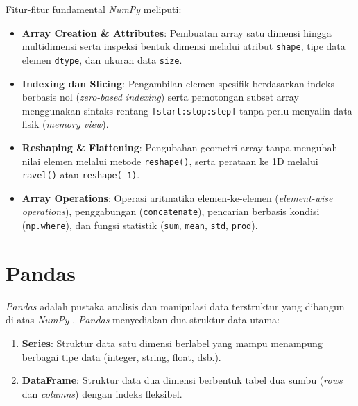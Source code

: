 \documentclass[a4paper,oneside,12pt]{report}
\begin{document}
Fitur-fitur fundamental \textit{NumPy} meliputi:
\begin{itemize}
    \item \textbf{Array Creation \& Attributes}: Pembuatan array satu dimensi hingga multidimensi serta inspeksi bentuk dimensi melalui atribut \texttt{shape}, tipe data elemen \texttt{dtype}, dan ukuran data \texttt{size}.
    \item \textbf{Indexing dan Slicing}: Pengambilan elemen spesifik berdasarkan indeks berbasis nol (\textit{zero-based indexing}) serta pemotongan subset array menggunakan sintaks rentang \texttt{[start:stop:step]} tanpa perlu menyalin data fisik (\textit{memory view}).
    \item \textbf{Reshaping \& Flattening}: Pengubahan geometri array tanpa mengubah nilai elemen melalui metode \texttt{reshape()}, serta perataan ke 1D melalui \texttt{ravel()} atau \texttt{reshape(-1)}.
    \item \textbf{Array Operations}: Operasi aritmatika elemen-ke-elemen (\textit{element-wise operations}), penggabungan (\texttt{concatenate}), pencarian berbasis kondisi (\texttt{np.where}), dan fungsi statistik (\texttt{sum}, \texttt{mean}, \texttt{std}, \texttt{prod}).
\end{itemize}

\section{Pandas}
\textit{Pandas} adalah pustaka analisis dan manipulasi data terstruktur yang dibangun di atas \textit{NumPy} \cite{ref2}. \textit{Pandas} menyediakan dua struktur data utama:
\begin{enumerate}
    \item \textbf{Series}: Struktur data satu dimensi berlabel yang mampu menampung berbagai tipe data (integer, string, float, dsb.).
    \item \textbf{DataFrame}: Struktur data dua dimensi berbentuk tabel dua sumbu (\textit{rows} dan \textit{columns}) dengan indeks fleksibel.
\end{enumerate}
\end{document}
